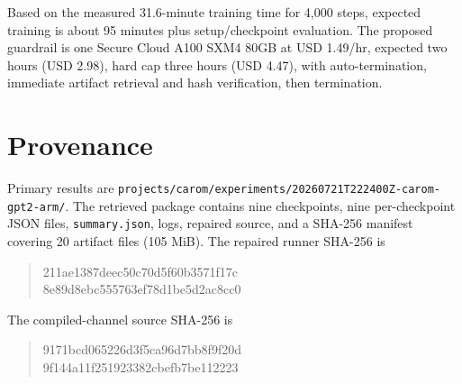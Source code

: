 \documentclass[10pt]{article}
\begin{document}
Based on the measured 31.6-minute training time for 4,000 steps, expected
training is about 95 minutes plus setup/checkpoint evaluation. The proposed
guardrail is one Secure Cloud A100 SXM4 80GB at USD 1.49/hr, expected two hours
(USD 2.98), hard cap three hours (USD 4.47), with auto-termination, immediate
artifact retrieval and hash verification, then termination.

\section{Provenance}

Primary results are
\nolinkurl{projects/carom/experiments/20260721T222400Z-carom-gpt2-arm/}.
The retrieved package contains nine checkpoints, nine per-checkpoint JSON files,
\texttt{summary.json}, logs, repaired source, and a SHA-256 manifest covering 20
artifact files (105 MiB). The repaired runner SHA-256 is
\begin{quote}\small\ttfamily
211ae1387deec50c70d5f60b3571f17c\\
8e89d8ebc555763ef78d1be5d2ac8cc0
\end{quote}
The compiled-channel source SHA-256 is
\begin{quote}\small\ttfamily
9171bcd065226d3f5ca96d7bb8f9f20d\\
9f144a11f251923382cbefb7be112223
\end{quote}
\end{document}
